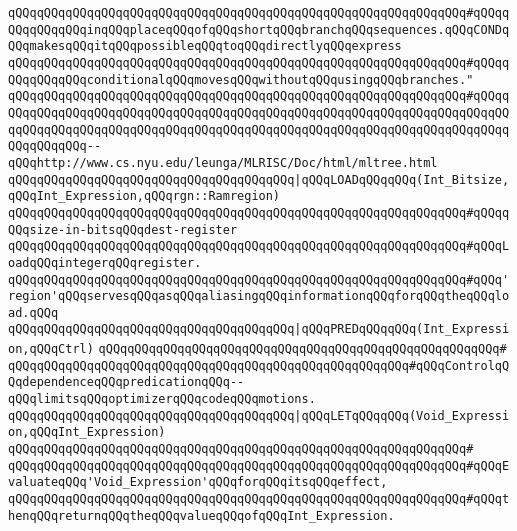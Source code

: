 \verb|qQQqqQQqqQQqqQQqqQQqqQQqqQQqqQQqqQQqqQQqqQQqqQQqqQQqqQQqqQQqqQQq#qQQqqQQqqQQqqQQqinqQQqplaceqQQqofqQQqshortqQQqbranchqQQqsequences.qQQqCONDqQQqmakesqQQqitqQQqpossibleqQQqtoqQQqdirectlyqQQqexpress|\newline
\verb|qQQqqQQqqQQqqQQqqQQqqQQqqQQqqQQqqQQqqQQqqQQqqQQqqQQqqQQqqQQqqQQq#qQQqqQQqqQQqqQQqconditionalqQQqmovesqQQqwithoutqQQqusingqQQqbranches."|\newline
\verb|qQQqqQQqqQQqqQQqqQQqqQQqqQQqqQQqqQQqqQQqqQQqqQQqqQQqqQQqqQQqqQQq#qQQqqQQqqQQqqQQqqQQqqQQqqQQqqQQqqQQqqQQqqQQqqQQqqQQqqQQqqQQqqQQqqQQqqQQqqQQqqQQqqQQqqQQqqQQqqQQqqQQqqQQqqQQqqQQqqQQqqQQqqQQqqQQqqQQqqQQqqQQqqQQqqQQqqQQqqQQq--qQQqhttp://www.cs.nyu.edu/leunga/MLRISC/Doc/html/mltree.html|\newline
\newline
\verb|qQQqqQQqqQQqqQQqqQQqqQQqqQQqqQQqqQQqqQQq|\verb#|qQQqLOADqQQqqQQq(Int_Bitsize,qQQqInt_Expression,qQQqrgn::Ramregion)#\newline
\verb|qQQqqQQqqQQqqQQqqQQqqQQqqQQqqQQqqQQqqQQqqQQqqQQqqQQqqQQqqQQqqQQq#qQQqqQQqsize-in-bitsqQQqdest-register|\newline
\verb|qQQqqQQqqQQqqQQqqQQqqQQqqQQqqQQqqQQqqQQqqQQqqQQqqQQqqQQqqQQqqQQq#qQQqLoadqQQqintegerqQQqregister.|\newline
\verb|qQQqqQQqqQQqqQQqqQQqqQQqqQQqqQQqqQQqqQQqqQQqqQQqqQQqqQQqqQQqqQQq#qQQq'region'qQQqservesqQQqasqQQqaliasingqQQqinformationqQQqforqQQqtheqQQqload.qQQq|\newline
\newline
\verb|qQQqqQQqqQQqqQQqqQQqqQQqqQQqqQQqqQQqqQQq|\verb#|qQQqPREDqQQqqQQq(Int_Expression,qQQqCtrl)#\newline
\verb|qQQqqQQqqQQqqQQqqQQqqQQqqQQqqQQqqQQqqQQqqQQqqQQqqQQqqQQq#|\newline
\verb|qQQqqQQqqQQqqQQqqQQqqQQqqQQqqQQqqQQqqQQqqQQqqQQqqQQqqQQq#qQQqControlqQQqdependenceqQQqpredicationqQQq--qQQqlimitsqQQqoptimizerqQQqcodeqQQqmotions.|\newline
\newline
\verb|qQQqqQQqqQQqqQQqqQQqqQQqqQQqqQQqqQQqqQQq|\verb#|qQQqLETqQQqqQQq(Void_Expression,qQQqInt_Expression)#\newline
\verb|qQQqqQQqqQQqqQQqqQQqqQQqqQQqqQQqqQQqqQQqqQQqqQQqqQQqqQQqqQQqqQQq#|\newline
\verb|qQQqqQQqqQQqqQQqqQQqqQQqqQQqqQQqqQQqqQQqqQQqqQQqqQQqqQQqqQQqqQQq#qQQqEvaluateqQQq'Void_Expression'qQQqforqQQqitsqQQqeffect,|\newline
\verb|qQQqqQQqqQQqqQQqqQQqqQQqqQQqqQQqqQQqqQQqqQQqqQQqqQQqqQQqqQQqqQQq#qQQqthenqQQqreturnqQQqtheqQQqvalueqQQqofqQQqInt_Expression.|\newline
